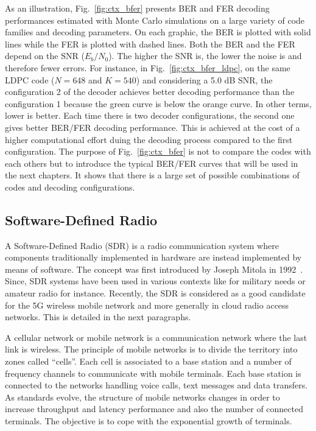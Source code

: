 As an illustration, Fig.~\ref{fig:ctx_bfer} presents BER and FER decoding
performances estimated with Monte Carlo simulations on a large variety of code
families and decoding parameters. On each graphic, the BER is plotted with solid
lines while the FER is plotted with dashed lines. Both the BER and the FER
depend on the SNR ($E_b/N_0$). The higher the SNR is, the lower the noise is and
therefore fewer errors. For instance, in Fig.~\ref{fig:ctx_bfer_ldpc}, on
the same LDPC code ($N = 648$ and $K = 540$) and considering a 5.0 dB SNR, the
configuration 2 of the decoder achieves better decoding performance than the
configuration 1 because the {\color{Paired-3} green} curve is below the
{\color{Paired-7} orange} curve. In other terms, lower is better. Each time
there is two decoder configurations, the second one gives better BER/FER
decoding performance. This is achieved at the cost of a higher computational
effort duing the decoding process compared to the first configuration. The
purpose of Fig.~\ref{fig:ctx_bfer} is not to compare the codes with each
others but to introduce the typical BER/FER curves that will be used in the next
chapters. It shows that there is a large set of possible combinations of codes
and decoding configurations.

\newpage
\subsection{Software-Defined Radio}

A Software-Defined Radio (SDR) is a radio communication system where components
traditionally implemented in hardware are instead implemented by means of
software. The concept was first introduced by Joseph Mitola in
1992~\cite{Mitola1992,Mitola1993}. Since, SDR systems have been used in various
contexts like for military needs or amateur radio for instance. Recently, the
SDR is considered as a good candidate for the 5G wireless mobile network and
more generally in cloud radio access networks. This is detailed in the next
paragraphs.

A cellular network or mobile network is a communication network where the last
link is wireless. The principle of mobile networks is to divide the territory
into zones called ``cells''. Each cell is associated to a base station and a
number of frequency channels to communicate with mobile terminals. Each base
station is connected to the networks handling voice calls, text messages and
data transfers. As standards evolve, the structure of mobile networks changes in
order to increase throughput and latency performance and also the number of
connected terminals. The objective is to cope with the exponential growth of
terminals.


